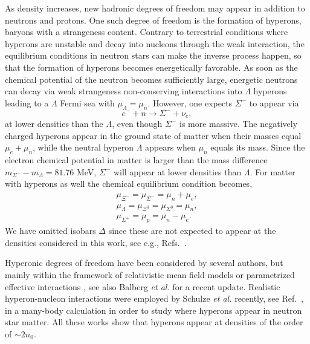 As density increases, new hadronic degrees of freedom may appear in addition
to neutrons and protons. 
One such degree of freedom is the formation of hyperons, baryons with a
strangeness content. 
Contrary to terrestrial conditions where hyperons are unstable and decay 
into nucleons through the weak interaction, the equilibrium conditions
in neutron stars can make the inverse process happen, so that the 
formation of hyperons becomes energetically favorable.      
As soon as the chemical potential
of the neutron becomes sufficiently large, energetic neutrons
can decay via weak strangeness non-conserving interactions
into $\Lambda$ hyperons leading to a $\Lambda$ Fermi sea
with $\mu_{\Lambda}=\mu_n$. 
However, one expects $\Sigma^-$ to appear via
\begin{equation}
    e^-+n \rightarrow \Sigma^- +\nu_e,
\end{equation}
at lower densities than the $\Lambda$, even though $\Sigma^-$ is more
massive. The negatively charged hyperons
appear in the ground state of matter when their masses
equal $\mu_e+\mu_n$, while the neutral hyperon $\Lambda$ 
appears when $\mu_n$ equals its mass. Since the 
electron chemical potential in matter is larger than 
the mass difference $m_{\Sigma^-}-m_{\Lambda}= 81.76$ MeV,
$\Sigma^-$ will appear at lower densities than $\Lambda$.
For matter with hyperons as well 
the chemical equilibrium condition becomes,
\begin{eqnarray}
    \mu_{\Xi^-}=\mu_{\Sigma^-} = \mu_n + \mu_e, \nonumber \\ 
    \mu_{\Lambda} = \mu_{\Xi^0}=\mu_{\Sigma^0} = \mu_n , \nonumber \\
    \mu_{\Sigma^+} = \mu_p = \mu_n - \mu_e .
    \label{eq:beta_baryonicmatter}
\end{eqnarray}
We have omitted isobars $\Delta$ 
since these are not expected to appear at the densities considered 
in this work, see e.g., Refs.\ \cite{glen97,prakash97}.

Hyperonic degrees of freedom have been considered by several authors,
but mainly within the framework of relativistic 
mean field models \cite{glen97,prakash97,pke95,ms96} or parametrized
effective interactions \cite{bg97}, see also Balberg {\em et al.} \cite{blc99}
for a recent update. Realistic hyperon-nucleon interactions
were employed by Schulze {\em et al.}  recently, see Ref.\ \cite{bbs98},
in a many-body calculation in order to study 
where hyperons appear in neutron star matter.  
All these works show that hyperons appear at densities of the order of
$\sim 2n_0$.

